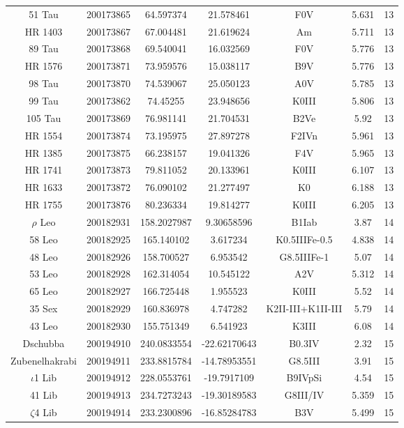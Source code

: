 \begin{table*}
\begin{tabular}{ccccccc}
51 Tau & 200173865 & 64.597374 & 21.578461 & F0V & 5.631 & 13 \\
HR 1403 & 200173867 & 67.004481 & 21.619624 & Am & 5.711 & 13 \\
89 Tau & 200173868 & 69.540041 & 16.032569 & F0V & 5.776 & 13 \\
HR 1576 & 200173871 & 73.959576 & 15.038117 & B9V & 5.776 & 13 \\
98 Tau & 200173870 & 74.539067 & 25.050123 & A0V & 5.785 & 13 \\
99 Tau & 200173862 & 74.45255 & 23.948656 & K0III & 5.806 & 13 \\
105 Tau & 200173869 & 76.981141 & 21.704531 & B2Ve & 5.92 & 13 \\
HR 1554 & 200173874 & 73.195975 & 27.897278 & F2IVn & 5.961 & 13 \\
HR 1385 & 200173875 & 66.238157 & 19.041326 & F4V & 5.965 & 13 \\
HR 1741 & 200173873 & 79.811052 & 20.133961 & K0III & 6.107 & 13 \\
HR 1633 & 200173872 & 76.090102 & 21.277497 & K0 & 6.188 & 13 \\
HR 1755 & 200173876 & 80.236334 & 19.814277 & K0III & 6.205 & 13 \\
$\rho$ Leo & 200182931 & 158.2027987 & 9.30658596 & B1Iab & 3.87 & 14 \\
58 Leo & 200182925 & 165.140102 & 3.617234 & K0.5IIIFe-0.5 & 4.838 & 14 \\
48 Leo & 200182926 & 158.700527 & 6.953542 & G8.5IIIFe-1 & 5.07 & 14 \\
53 Leo & 200182928 & 162.314054 & 10.545122 & A2V & 5.312 & 14 \\
65 Leo & 200182927 & 166.725448 & 1.955523 & K0III & 5.52 & 14 \\
35 Sex & 200182929 & 160.836978 & 4.747282 & K2II-III+K1II-III & 5.79 & 14 \\
43 Leo & 200182930 & 155.751349 & 6.541923 & K3III & 6.08 & 14 \\
Dschubba & 200194910 & 240.0833554 & -22.62170643 & B0.3IV & 2.32 & 15 \\
Zubenelhakrabi & 200194911 & 233.8815784 & -14.78953551 & G8.5III & 3.91 & 15 \\
$\iota$1 Lib & 200194912 & 228.0553761 & -19.7917109 & B9IVpSi & 4.54 & 15 \\
41 Lib & 200194913 & 234.7273243 & -19.30189583 & G8III/IV & 5.359 & 15 \\
$\zeta$4 Lib & 200194914 & 233.2300896 & -16.85284783 & B3V & 5.499 & 15 \\

\end{tabular}
\end{table*}
